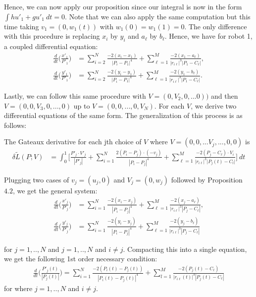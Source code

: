 Hence, we can now apply our proposition since our integral is now in the form \( \int hu'_1 + gu'_1 \ dt = 0\). Note that we can also apply the same computation but this time taking \( v_1 = (0,w_1(t)) \) with \( w_1(0) = w_1(1) = 0 \). The only difference with this procedure is replacing \( x_i \) by \( y_i \) and \( a_{\ell} \) by \( b_{\ell} \). Hence, we have for robot 1, a coupled differential equation: 
\begin{align*}
    \frac{d}{dt}\bigg( \frac{x'_1}{P'_1}\bigg) &= \sum_{i=2}^{N} \frac{-2(x_i - x_1)}{|P_i - P_1|^4} +  
    \sum_{\ell = 1}^{M} \frac{-2(x_1-a_{\ell})}{|r_{i\ell}|^3|P_1 - C_{\ell}|}, \\
     \frac{d}{dt}\bigg( \frac{y'_1}{P'_1}\bigg) &= \sum_{i=2}^{N} \frac{-2(y_i - y_1)}{|P_i - P_1|^4} +  
    \sum_{\ell = 1}^{M} \frac{-2(y_1-b_{\ell})}{|r_{i\ell}|^3|P_1 - C_{\ell}|}.
\end{align*}

Lastly, we can follow this same procedure with \( V = (0,V_2,0,...0)) \) and then \( V = (0,0,V_3,0,...,0 ) \) up to \( V = (0,0,...,0,V_N) \). For each \( V\), we derive two differential equations of the same form. The generalization of this process is as follows: 

The Gateaux derivative for each jth choice of \( V\) where \( V = (0,0,...V_j,...,0,0) \) is 
\begin{align*}
    \delta \tilde{L} (P;V) &= \int_{0}^{1} \bigg[\frac{P'_j \cdot V'_j}{|P'_j|} +\sum_{i=1}^{N} \frac{2(P_i - P_j) \cdot (- v_j)}{| P_i - P_j|^4} 
               + \sum_{\ell=1}^{M} \frac{-2(P_j - C_{\ell}) \cdot V_i}{\big| r_{i\ell}\big|^3\big|P_j(t) - C_l \big| } \bigg] \ dt
\end{align*}


Plugging two cases of \( v_j = (u_j,0) \) and \( V_j = (0,w_j) \) followed by Proposition \(4.2\), we get the general system:
\begin{align*}
    \frac{d}{dt}\bigg( \frac{x'_j}{P'_j}\bigg) &= \sum_{i=1}^{N} \frac{-2(x_i - x_j)}{|P_i - P_j|^4} +  
    \sum_{\ell = 1}^{M} \frac{-2(x_j-a_{\ell})}{|r_{i\ell}|^3|P_j - C_{\ell}|}, \\
     \frac{d}{dt}\bigg( \frac{y'_j}{P'_j}\bigg) &= \sum_{i=1}^{N} \frac{-2(y_i - y_j)}{|P_i - P_j|^4} +  
    \sum_{\ell = 1}^{M} \frac{-2(y_j-b_{\ell})}{|r_{i\ell}|^3|P_j - C_{\ell}|}
\end{align*}

for \( j = 1,..,N \) and \( j = 1,..,N \) and \( i \neq j \). Compacting this into a single equation, we get the following 1st order necessary condition:
\begin{align*}
    \frac{d}{dt}\bigg( \frac{P'_j(t)}{|P_j(t)|}\bigg) = \sum_{i=1}^{N} \frac{-2(P_i(t) - P_j(t))}{|P_i(t) - P_j(t)|^4} + \sum_{l=1}^{M} \frac{-2(P_j(t) - C_{\ell})}{|r_{i\ell}(t)|^3|P_j(t) - C_{\ell}|}
\end{align*}
for where \( j = 1,..,N \) and \( i \neq j \).

